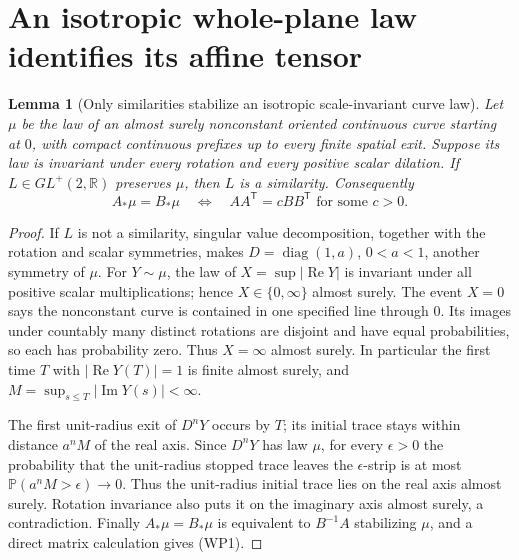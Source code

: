 \documentclass[11pt]{article}
\newtheorem{lemma}[theorem]{Lemma}
\theoremstyle{definition}\newtheorem{definition}[theorem]{Definition}
\theoremstyle{remark}\newtheorem{remark}[theorem]{Remark}
\newcommand{\RR}{\mathbb R}
\begin{document}
\section{An isotropic whole-plane law identifies its affine tensor}
\label{sec:wholeplane-decoder}

\begin{lemma}[Only similarities stabilize an isotropic scale-invariant curve law]
\label{lem:wp-stabilizer}
Let $\mu$ be the law of an almost surely nonconstant oriented continuous
curve starting at $0$, with compact continuous prefixes up to every
finite spatial exit. Suppose its law is invariant under every rotation
and every positive scalar dilation. If $L\in GL^+(2,\RR)$ preserves
$\mu$, then $L$ is a similarity. Consequently
\[
 A_*\mu=B_*\mu
 \quad\Longleftrightarrow\quad
 AA^{\mathsf T}=cBB^{\mathsf T}\text{ for some }c>0.
 \tag{WP1}
\]
\end{lemma}
\begin{proof}
If $L$ is not a similarity, singular value decomposition, together
with the rotation and scalar symmetries, makes
$D=\operatorname{diag}(1,a)$, $0<a<1$, another symmetry of $\mu$.
For $Y\sim\mu$, the law of $X=\sup|\operatorname{Re}Y|$
is invariant under all positive scalar multiplications; hence
$X\in\{0,\infty\}$ almost surely. The event $X=0$ says the
nonconstant curve is contained in one specified line through $0$.
Its images under countably many distinct rotations are disjoint and
have equal probabilities, so each has probability zero. Thus $X=\infty$
almost surely. In particular the first time $T$ with
$|\operatorname{Re}Y(T)|=1$ is finite almost surely, and
$M=\sup_{s\le T}|\operatorname{Im}Y(s)|<\infty$.

The first unit-radius exit of $D^nY$ occurs by $T$; its initial
trace stays within distance $a^nM$ of the real axis. Since $D^nY$
has law $\mu$, for every $\epsilon>0$ the probability that the
unit-radius stopped trace leaves the $\epsilon$-strip is at most
$\mathbb P(a^nM>\epsilon)\to0$. Thus the unit-radius initial
trace lies on the real axis almost surely. Rotation invariance
also puts it on the imaginary axis almost surely, a contradiction.
Finally $A_*\mu=B_*\mu$ is equivalent to $B^{-1}A$ stabilizing
$\mu$, and a direct matrix calculation gives (WP1).
\end{proof}
\end{document}
